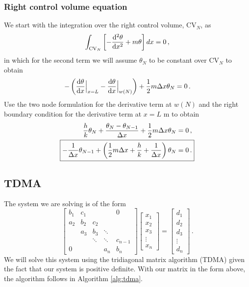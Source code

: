 \documentclass{article}
\begin{document}
\subsubsection*{Right control volume equation}

We start with the integration over the right control volume, CV$_N$, as
\[
	\int_{\text{CV}_N} \left[ -\dv{^2\theta}{x^2} + m \theta \right] dx = 0\,,
\]
in which for the second term we will assume $\theta_N$ to be constant over CV$_N$ to obtain
\[
	- \left( \dv{\theta}{x}\Big|_{x = L} - \dv{\theta}{x}\Big|_{w(N)} \right) + \frac{1}{2} m \Delta x \theta_N = 0\,.
\]
Use the two node formulation for the derivative term at $w(N)$ and the right boundary condition for the derivative term at $x = L$ m to obtain
\begin{align}
	\frac{h}{k} \theta_N + \frac{\theta_N - \theta_{N-1}}{\Delta x} + \frac{1}{2} m \Delta x \theta_N & = 0\,,\nonumber\\
	\Aboxed{- \frac{1}{\Delta x} \theta_{N-1} + \left(\frac{1}{2} m \Delta x + \frac{h}{k} + \frac{1}{\Delta x}\right) \theta_N & = 0\,.}
\end{align}

\subsection*{TDMA}

The system we are solving is of the form
\renewcommand*{\arraystretch}{1.3}
\[
	\begin{bmatrix}
		b_1 & c _1 & & & 0 \\
		a_2 & b_2 & c_2 \\
		& a_3 & b_3 & \ddots & \\
		& & \ddots & \ddots & c_{n - 1} \\
		0 & & & a_n & b_n
	\end{bmatrix}
	\begin{bmatrix}
		x_1 \\
		x_2 \\
		x_3 \\
		\vdots \\
		x_n
	\end{bmatrix}
	=
	\begin{bmatrix}
		d_1 \\
		d_2 \\
		d_3 \\
		\vdots \\
		d_n
	\end{bmatrix}\,.
\]
We will solve this system using the tridiagonal matrix algorithm (TDMA) given the fact that our system is positive definite. With our matrix in the form above, the algorithm follows in Algorithm \ref{alg:tdma}.
\end{document}
